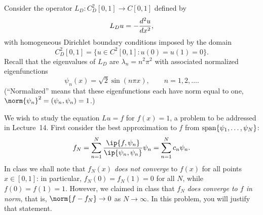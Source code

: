 Consider the operator $L_D: C^2_D[0,1]\to C[0,1]$ defined by
\[ L_D u = -{d^2 u \over dx^2},\]
with homogeneous Dirichlet boundary conditions imposed by the domain
\[ C^2_D[0,1] = \{ u \in C^2[0,1] : u(0) = u(1) = 0\}.\]
Recall that the eigenvalues of $L_D$ are
$\lambda_n = n^2 \pi^2$ with associated normalized eigenfunctions
 \[ \psi_n(x) = \sqrt{2} \sin(n \pi x), \qquad n=1,2,\ldots.\]
(``Normalized'' means that these eigenfunctions each have norm equal to one, 
$\norm{\psi_n}^2 = (\psi_n,\psi_n)=1$.)

We wish to study the equation $Lu=f$ for $f(x) = 1$, a problem to be
addressed in Lecture~14.  First consider the best approximation to
$f$ from ${\rm span}\{\psi_1, \ldots, \psi_N\}$:
\[ f_N = \sum_{n=1}^N {\ip{f, \psi_n}\over \ip{\psi_n,\psi_n}} \psi_n
       = \sum_{n=1}^N c_n \psi_n.\]
In class we shall note that $f_N(x)$ \emph{does not converge} to $f(x)$ 
for all points $x\in[0,1]$: in particular, $f_N(0)=f_N(1)=0$ for all $N$, 
while $f(0)=f(1)=1$.  However, we claimed in class that $f_N$ 
\emph{does converge to $f$ in norm}, that is, 
$\norm{f-f_N} \to 0$ as $N\to\infty$.  
In this problem, you will justify that statement.

